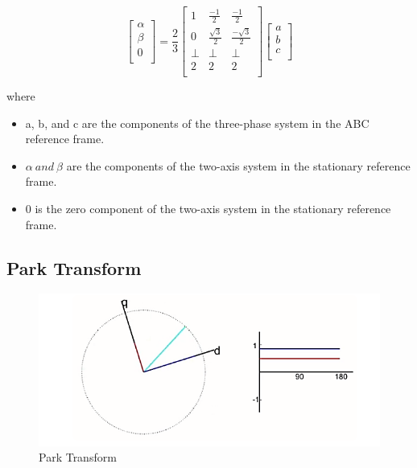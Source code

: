\documentclass[12pt,a4paper]{book}
\begin{document}
\begin{equation}
  \begin{bmatrix}
    \alpha \\
    \beta \\
    0 \\
    \end{bmatrix} = \frac{2}{3}\begin{bmatrix}
    1 & \frac{- 1}{2} & \frac{- 1}{2} \\
    0 & \frac{\sqrt{3}}{2} & \frac{- \sqrt{3}}{2} \\
    \bot & \bot & \bot \\
    2 & 2 & 2 \\
    \end{bmatrix}\begin{bmatrix}
    a \\
    b \\
    c \\
    \end{bmatrix}
  \label{equation:eq10}
\end{equation}

where
\begin{itemize}
  \item a, b, and c are the components of the three-phase system in the ABC reference frame.
  \item \(\alpha \ and \ \beta\) are the components of the two-axis system in the stationary reference frame.
  \item 0 is the zero component of the two-axis system in the stationary reference frame.
\end{itemize}

\subsection{Park Transform}
\begin{figure}[h]
  \centering
  \includegraphics[width=12cm]{image18.png}
  \caption{Park Transform}
  \label{fig:image18}
\end{figure}
\end{document}
